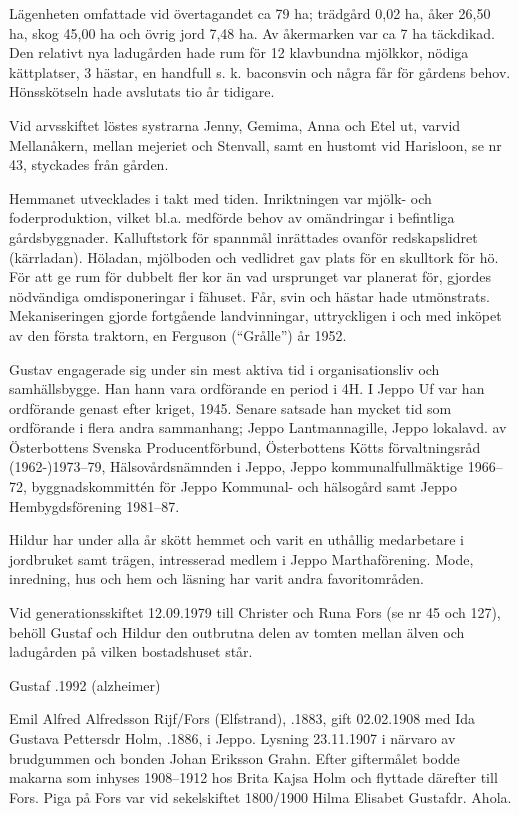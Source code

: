Lägenheten omfattade vid övertagandet ca 79 ha; trädgård 0,02 ha, åker 26,50 ha, skog 45,00 ha och övrig jord 7,48 ha. Av åkermarken var ca 7 ha täckdikad. Den relativt nya ladugården hade rum för 12 klavbundna mjölkkor, nödiga kättplatser, 3 hästar, en handfull s. k. baconsvin och några får för gårdens behov. Hönsskötseln hade avslutats tio år tidigare.

Vid arvsskiftet löstes systrarna Jenny, Gemima, Anna och Etel ut, varvid Mellanåkern, mellan mejeriet och Stenvall, samt en hustomt vid Harisloon, se nr 43, styckades från gården.

Hemmanet utvecklades i takt med tiden. Inriktningen var mjölk- och foderproduktion, vilket bl.a. medförde behov av omändringar i befintliga gårdsbyggnader. Kalluftstork för spannmål inrättades ovanför redskapslidret (kärrladan). Höladan, mjölboden och vedlidret gav plats för en skulltork för hö. För att ge rum för dubbelt fler kor än vad ursprunget var planerat för, gjordes nödvändiga omdisponeringar i fähuset. Får, svin och hästar hade utmönstrats. Mekaniseringen gjorde fortgående landvinningar, uttryckligen i och med inköpet av den första traktorn, en Ferguson (``Grålle'') år 1952.

Gustav engagerade sig under sin mest aktiva tid i organisationsliv och 	samhällsbygge. Han hann vara ordförande en period i 4H. I Jeppo Uf var han ordförande genast efter kriget, 1945. Senare satsade han mycket tid som ordförande i flera andra sammanhang; Jeppo Lantmannagille, Jeppo lokalavd. av Österbottens Svenska Producentförbund, Österbottens Kötts förvaltningsråd (1962-)1973--79, Hälsovårdsnämnden i Jeppo, Jeppo kommunalfullmäktige 1966--72, byggnadskommittén för Jeppo Kommunal- och hälsogård samt Jeppo Hembygdsförening 1981--87.

Hildur har under alla år skött hemmet och varit en uthållig medarbetare i jordbruket samt trägen, intresserad medlem i Jeppo Marthaförening. Mode, inredning, hus och hem och läsning har varit andra favoritområden.

Vid generationsskiftet 12.09.1979 till Christer och Runa Fors (se nr 45 och 127), behöll Gustaf och Hildur den outbrutna delen av tomten mellan älven och ladugården på vilken bostadshuset står.

Gustaf .1992 (alzheimer)



Emil Alfred Alfredsson Rijf/Fors (Elfstrand), .1883, gift 02.02.1908 med Ida Gustava Pettersdr Holm, .1886, i Jeppo. Lysning 23.11.1907 i närvaro av brudgummen och bonden Johan Eriksson Grahn. Efter giftermålet bodde makarna som inhyses 1908--1912 hos Brita Kajsa Holm och flyttade därefter till Fors. Piga på Fors var vid sekelskiftet 1800/1900 Hilma Elisabet Gustafdr. Ahola.

